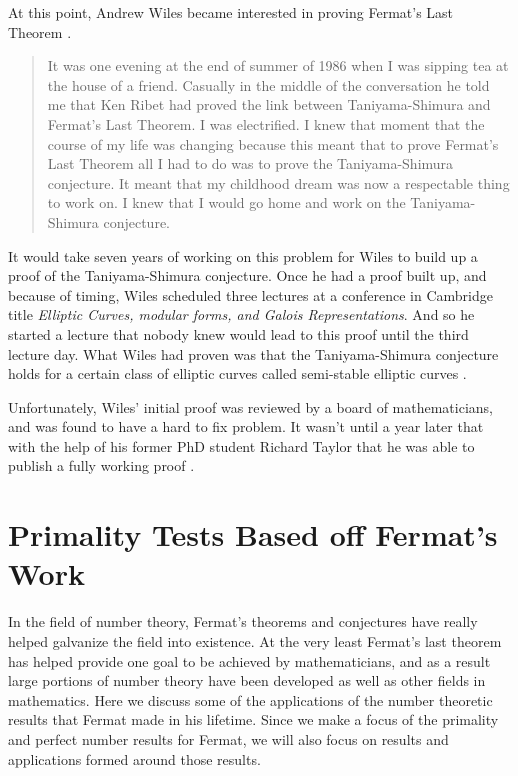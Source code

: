 \documentclass[11pt]{article}
\begin{document}
At this point, Andrew Wiles became interested in proving Fermat's Last
Theorem \cite{Kleiner}.
\begin{quote}
    It was one evening at the end of summer of 1986 when I was sipping tea
    at the house of a friend.
    Casually in the middle of the conversation he told me that Ken Ribet had
    proved the link between Taniyama-Shimura and Fermat's Last Theorem.
    I was electrified.
    I knew that moment that the course of my life was changing because this
    meant that to prove Fermat's Last Theorem all I had to do was to
    prove the Taniyama-Shimura conjecture.
    It meant that my childhood dream was now a respectable thing to work on.
    I knew that I would go home and work on the Taniyama-Shimura conjecture.
\end{quote}
It would take seven years of working on this problem for Wiles to build up a
proof of the Taniyama-Shimura conjecture.
Once he had a proof built up, and because of timing, Wiles scheduled three
lectures at a conference in Cambridge title \emph{Elliptic Curves, modular forms, and
Galois Representations}.
And so he started a lecture that nobody knew would lead to this proof until the
third lecture day.
What Wiles had proven was that the Taniyama-Shimura conjecture holds for a certain
class of elliptic curves called semi-stable elliptic curves \cite{Kleiner}.

Unfortunately, Wiles' initial proof was reviewed by a board of mathematicians, and
was found to have a hard to fix problem.
It wasn't until a year later that with the help of his former PhD student 
Richard Taylor that he was able to publish a fully working proof \cite{Kleiner}.


\section*{Primality Tests Based off Fermat's Work}
In the field of number theory, Fermat's theorems and conjectures have really
helped galvanize the field into existence.
At the very least Fermat's last theorem has helped provide one goal to be achieved
by mathematicians, and as a result large portions of number theory have been developed
as well as other fields in mathematics.
Here we discuss some of the applications of the number theoretic
results that Fermat made in his lifetime.
Since we make a focus of the primality and perfect number results for Fermat, we
will also focus on results and applications formed around those results.
\end{document}
